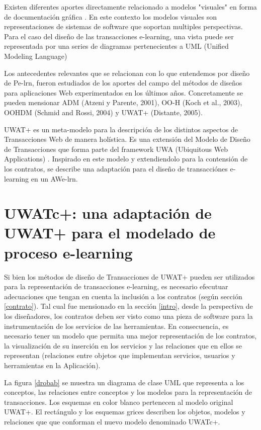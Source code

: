 \documentclass[12 pt,a4paper]{llncs}
\begin{document}
Existen diferentes aportes  directamente relacionado a modelos "visuales" en forma de documentación gráfica \cite{5,10,12}. En este contexto los modelos visuales son representaciones de sistemas de software que soportan multiples perspectivas. Para el caso del diseño de las transacciones e-learning, una vista puede ser representada por una series de diagramas pertenecientes a UML (Unified Modeling Language) \cite{UML} 

Los antecedentes relevantes que se relacionan con lo que entendemos por diseño de Pe-lrn, fueron estudiados de los aportes del campo del métodos de diseños para aplicaciones Web experimentados en los últimos años. Concretamente se pueden mensionar ADM (Atzeni y Parente, 2001), OO-H (Koch et al., 2003), OOHDM (Schmid and Rossi, 2004) y UWAT+ (Distante, 2005).

UWAT+ es un meta-modelo para la descripción de los distintos aspectos de Transacciones Web de manera holística. Es una extensión del Modelo de Diseño de Transacciones que forma  parte del framework UWA (Ubiquitous Web Applications) \cite{UWA}. Inspirado en este modelo y extendiendolo para la contensión de los contratos, se describe una adaptación para el diseño de transacciónes e-learning en un AWe-lrn.

\section {UWATc+: una adaptación de UWAT+ para el modelado de proceso e-learning} \label{uwatc}

Si bien los métodos de diseño de Transacciones de UWAT+ pueden ser utilizados para la representación de transacciones e-learning, es necesario efecutuar adecuaciones que tengan en cuenta la inclusión a los contratos (según sección \ref{contrato}). Tal cual fue mensionado en la sección \ref{intro}, desde la perspectiva de los diseñadores, los contratos deben ser visto como una pieza de software para la instrumentación de los servicios de las herramientas. En consecuencia, es necesario tener un modelo que permita una mejor representación de los contratos, la visualización de su inserción en los servicios y las relaciones que en ellos se representan (relaciones entre objetos que implementan servicios, usuarios y herramientas en la Aplicación). 


La figura \ref{drobab} se muestra un diagrama de clase UML que representa a los conceptos, las relaciones entre conceptos y los modelos para la representación de transacciones. Los esquemas en color blanco pertenecen al modelo original UWAT+. El rectángulo y los esquemas grices describen los objetos, modelos y relaciones que  que conforman el nuevo modelo denominado UWATc+.
\end{document}
